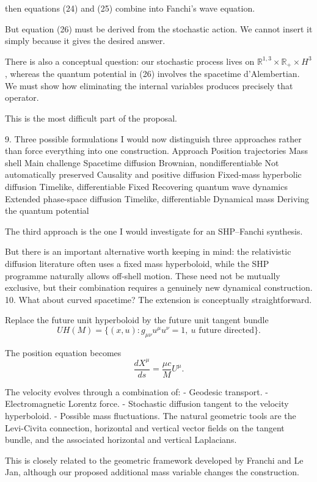 then equations (24) and (25) combine into Fanchi's wave equation.

But equation (26) must be derived from the stochastic action. We cannot insert it simply because it gives the desired answer.

There is also a conceptual question: our stochastic process lives on \(\mathbb R^{1,3}\times\mathbb R_+\times H^3\), whereas the quantum potential in (26) involves the spacetime d'Alembertian. We must show how eliminating the internal variables produces precisely that operator.

This is the most difficult part of the proposal.

9. Three possible formulations
I would now distinguish three approaches rather than force everything into one construction.
Approach	Position trajectories	Mass shell	Main challenge
Spacetime diffusion	Brownian, nondifferentiable	Not automatically preserved	Causality and positive diffusion
Fixed-mass hyperbolic diffusion	Timelike, differentiable	Fixed	Recovering quantum wave dynamics
Extended phase-space diffusion	Timelike, differentiable	Dynamical mass	Deriving the quantum potential

The third approach is the one I would investigate for an SHP–Fanchi synthesis.

But there is an important alternative worth keeping in mind: the relativistic diffusion literature often uses a fixed mass hyperboloid, while the SHP programme naturally allows off-shell motion. These need not be mutually exclusive, but their combination requires a genuinely new dynamical construction.
10. What about curved spacetime?
The extension is conceptually straightforward.

Replace the future unit hyperboloid by the future unit tangent bundle
\[
UH(M)=
\{(x,u):g_{\mu\nu}u^\mu u^\nu=1,\ u\text{ future directed}\}.
\]

The position equation becomes
\[
\frac{dX^\mu}{ds}
=
\frac{\mu c}{M}U^\mu.
\]

The velocity evolves through a combination of:
- Geodesic transport.
- Electromagnetic Lorentz force.
- Stochastic diffusion tangent to the velocity hyperboloid.
- Possible mass fluctuations.
The natural geometric tools are the Levi-Civita connection, horizontal and vertical vector fields on the tangent bundle, and the associated horizontal and vertical Laplacians.

This is closely related to the geometric framework developed by Franchi and Le Jan, although our proposed additional mass variable changes the construction.

